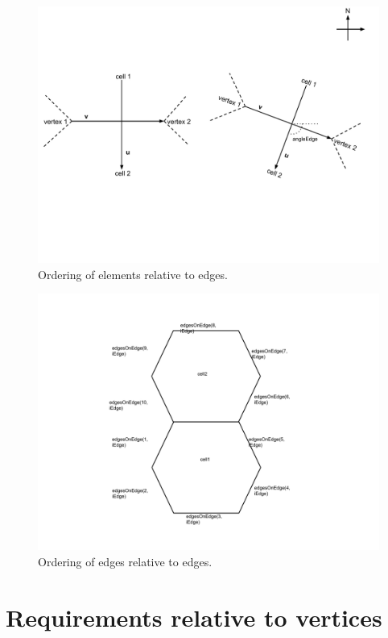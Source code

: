 \documentclass[11pt]{report}
\begin{document}
\begin{figure}
	\centering
	\includegraphics[scale=0.4]{figures/Edge Diagram.pdf}
	\caption{Ordering of elements relative to edges.}
\end{figure}

\begin{figure}
	\centering
	\includegraphics[scale=0.4]{figures/EdgeOnEdge Diagram.pdf}
	\caption{Ordering of edges relative to edges.}
\end{figure}

\section{Requirements relative to vertices}
\end{document}
